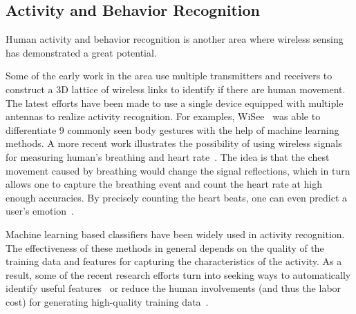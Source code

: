 




\subsection{Activity and Behavior Recognition}
Human activity and behavior recognition is another area where wireless sensing has demonstrated a great potential.

Some of the early work in the area use multiple transmitters and receivers to construct a 3D lattice of wireless links to identify if there
are human movement. The latest efforts have been made to use a single device equipped with multiple antennas to realize activity recognition. For examples, WiSee~\cite{WiSee} was able to differentiate 9 commonly seen body gestures with the help of machine learning methods. %
A more recent work illustrates the possibility of using
wireless signals for measuring human's breathing and heart rate~\cite{Smart-homes}. The idea is that the chest movement caused by
breathing would change the signal reflections, which in turn allows one to capture the breathing event and count the heart rate at high enough
accuracies. By precisely counting the heart beats, one can even predict a user's emotion~\cite{Zhao2017Emotion}.

Machine learning based classifiers have been widely used in activity recognition. The effectiveness of these methods in general depends on
the quality of the training data and features for capturing the characteristics of the activity. As a result, some of the recent research
efforts turn into seeking ways to automatically identify useful features~\cite{CrossSense} or reduce the human involvements (and thus the
 labor cost) for generating high-quality training data~\cite{zhao2018rf}.





